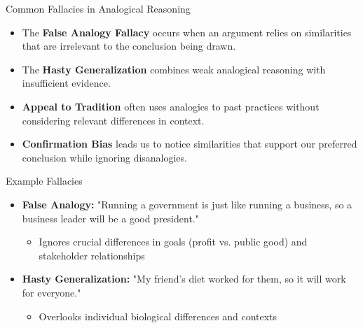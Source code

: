 \documentclass{beamer}
\begin{document}
	\begin{frame}{Common Fallacies in Analogical Reasoning}
		\begin{itemize}
			\item The \textbf{False Analogy Fallacy} occurs when an argument relies on similarities that are irrelevant to the conclusion being drawn.
			\item The \textbf{Hasty Generalization} combines weak analogical reasoning with insufficient evidence.
			\item \textbf{Appeal to Tradition} often uses analogies to past practices without considering relevant differences in context.
			\item \textbf{Confirmation Bias} leads us to notice similarities that support our preferred conclusion while ignoring disanalogies.
		\end{itemize}
		
		\begin{block}{Example Fallacies}
			
			\begin{itemize}
				\item \textbf{False Analogy:} "Running a government is just like running a business, so a business leader will be a good president."
				\begin{itemize}
					\scriptsize
					\item Ignores crucial differences in goals (profit vs. public good) and stakeholder relationships
				\end{itemize}
				\item \textbf{Hasty Generalization:} "My friend's diet worked for them, so it will work for everyone."
				\begin{itemize}
					\scriptsize
					\item Overlooks individual biological differences and contexts
				\end{itemize}
			\end{itemize}
		\end{block}
	\end{frame}
	
\end{document}
